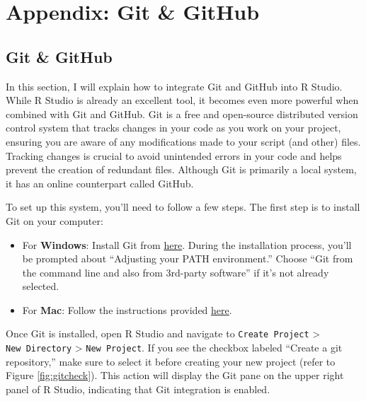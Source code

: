\documentclass[
]{book}
\begin{document}
\hypertarget{appendix-git-github}{%
\chapter{Appendix: Git \& GitHub}\label{appendix-git-github}}

\hypertarget{git-github}{%
\section{Git \& GitHub}\label{git-github}}

In this section, I will explain how to integrate Git and GitHub into R Studio. While R Studio is already an excellent tool, it becomes even more powerful when combined with Git and GitHub. Git is a free and open-source distributed version control system that tracks changes in your code as you work on your project, ensuring you are aware of any modifications made to your script (and other) files. Tracking changes is crucial to avoid unintended errors in your code and helps prevent the creation of redundant files. Although Git is primarily a local system, it has an online counterpart called GitHub.

To set up this system, you'll need to follow a few steps. The first step is to install Git on your computer:

\begin{itemize}
\item
  For \textbf{Windows}: Install Git from \href{https://gitforwindows.org/}{here}. During the installation process, you'll be prompted about ``Adjusting your PATH environment.'' Choose ``Git from the command line and also from 3rd-party software'' if it's not already selected.
\item
  For \textbf{Mac}: Follow the instructions provided \href{https://happygitwithr.com/install-git.html}{here}.
\end{itemize}

Once Git is installed, open R Studio and navigate to \texttt{Create\ Project} \textgreater{} \texttt{New\ Directory} \textgreater{} \texttt{New\ Project}. If you see the checkbox labeled ``Create a git repository,'' make sure to select it before creating your new project (refer to Figure \ref{fig:gitcheck}). This action will display the Git pane on the upper right panel of R Studio, indicating that Git integration is enabled.
\end{document}
